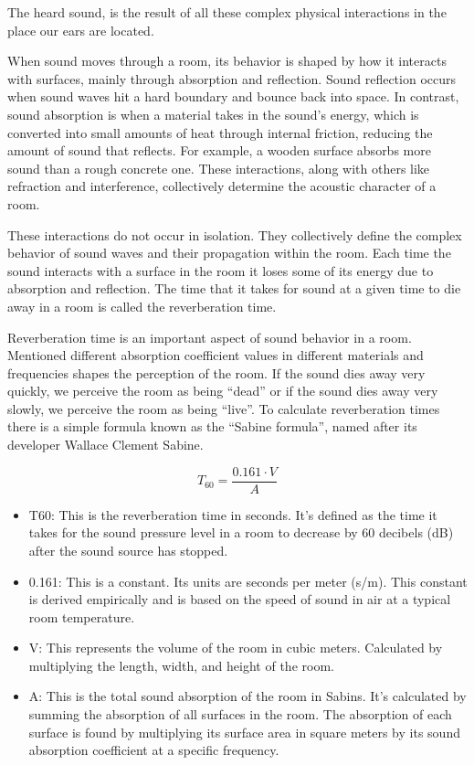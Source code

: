             The heard sound, is the result of all these complex physical interactions in the place our ears are located.\par

            When sound moves through a room, its behavior is shaped by how it interacts with surfaces, mainly through absorption and reflection. Sound reflection occurs when sound waves hit a hard boundary and bounce back into space. In contrast, sound absorption is when a material takes in the sound's energy, which is converted into small amounts of heat through internal friction, reducing the amount of sound that reflects\cite{Blank}. For example, a wooden surface absorbs more sound than a rough concrete one. These interactions, along with others like refraction and interference, collectively determine the acoustic character of a room.\par

            These interactions do not occur in isolation. They collectively define the complex behavior of sound waves and their propagation within the room. Each time the sound interacts with a surface in the room it loses some of its energy due to absorption and reflection. The time that it takes for sound at a given time to die away in a room is called the reverberation time.\par

            Reverberation time is an important aspect of sound behavior in a room. Mentioned different absorption coefficient values in different materials and frequencies shapes the perception of the room. If the sound dies away very quickly, we perceive the room as being “dead” or if the sound dies away very slowly, we perceive the room as being “live”. To calculate reverberation times there is a simple formula known as the “Sabine formula”, named after its developer Wallace Clement Sabine\cite{Blank}.\par 
            $$T_{60} = \frac{0.161 \cdot V}{A}$$
            \begin{itemize}
                \item T60: This is the reverberation time in seconds. It's defined as the time it takes for the sound pressure level in a room to decrease by 60 decibels (dB) after the sound source has stopped.
                \item 0.161: This is a constant. Its units are seconds per meter (s/m). This constant is derived empirically and is based on the speed of sound in air at a typical room temperature.
                \item V: This represents the volume of the room in cubic meters. Calculated by multiplying the length, width, and height of the room.
                \item A: This is the total sound absorption of the room in Sabins. It's calculated by summing the absorption of all surfaces in the room. The absorption of each surface is found by multiplying its surface area in square meters by its sound absorption coefficient at a specific frequency.
            \end{itemize}

